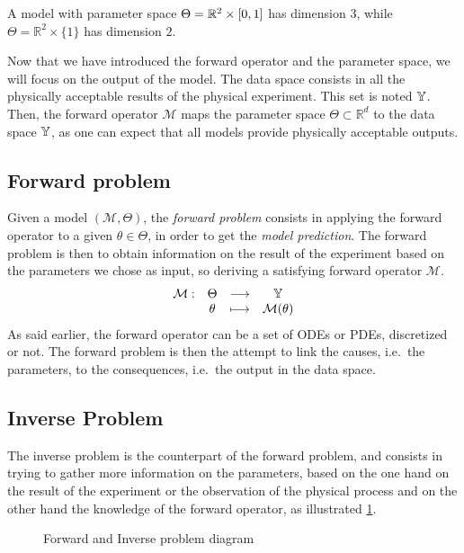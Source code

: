 \documentclass[../../Main_ManuscritThese.tex]{subfiles}
\newcommand\imgpath{/home/victor/acadwriting/Manuscrit/Text/Chapter2/img/}
\begin{document}
\begin{example}
  A model with parameter space $\Theta = \mathbb{R}^2\times \interval{0}{1}$ has dimension $3$, while $\Theta = \mathbb{R}^2 \times \{1\}$ has dimension $2$.
\end{example}
 Now that we have introduced the forward operator and the parameter space, we will focus on the output of the model.
The data space consists in all the physically acceptable results of the physical experiment. This set is noted $\mathbb{Y}$.
Then, the forward operator $\mathcal{M}$ maps the parameter space $\Theta \subset \mathbb{R}^{d}$ to the data space $\mathbb{Y}$, as one can expect that all models provide physically acceptable outputs.

\subsection{Forward problem}
Given a model $(\mathcal{M}, \Theta)$, the \emph{forward problem} consists in applying the forward operator to a given $\theta \in \Theta$, in order to get the \emph{model prediction}. The forward problem is then to obtain information on the result of the experiment based on the parameters we chose as input, so deriving a satisfying forward operator $\mathcal{M}$.
\begin{equation}
  \begin{array}{cccc}
    \mathcal{M}:& \Theta &\longrightarrow & \mathbb{Y} \\
                & \theta &\longmapsto     & \mathcal{M}(\theta)
  \end{array}
\end{equation}
As said earlier, the forward operator can be a set of ODEs or PDEs, discretized or not. The forward problem is then the attempt to link the causes, i.e.\ the parameters, to the consequences, i.e.\ the output in the data space.

\subsection{Inverse Problem}
The inverse problem is the counterpart of the forward problem, and consists in trying to gather more information on the parameters, based on the one hand on the result of the experiment or the observation of the physical process and on the other hand the knowledge of the forward operator, as illustrated \cref{fig:inv_problem_pple}.

\begin{figure}[ht]
  \centering
  
  \caption{Forward and Inverse problem diagram}
  \label{fig:inv_problem_pple}
\end{figure}
\end{document}
